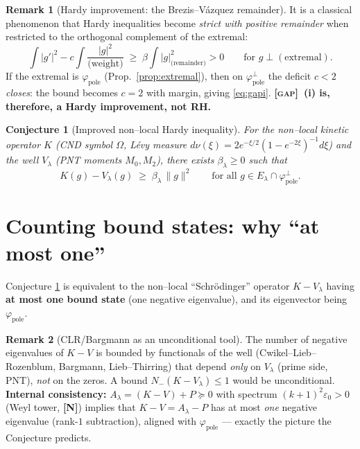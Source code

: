 \documentclass[11pt]{article}
\newcommand{\NM}{\textcolor{blue!70!black}{\textbf{[N]}}}
\newcommand{\GAP}{\textcolor{red!75!black}{\textsc{[gap]}}}
\theoremstyle{plain}
\newtheorem{conjecture}{Conjecture}
\theoremstyle{definition}
\newtheorem{remark}{Remark}
\newcommand{\El}{E_\lambda}
\newcommand{\kin}{K}
\newcommand{\vv}{V}
\newcommand{\pole}{P}
\newcommand{\fp}{\varphi_{\mathrm{pole}}}
\begin{document}
\begin{remark}[Hardy improvement: the Brezis--Vázquez remainder]
It is a classical phenomenon that Hardy inequalities become \emph{strict with
positive remainder} when restricted to the orthogonal complement of the extremal:
\[
  \int|g'|^2-c\!\int\!\frac{|g|^2}{\text{(weight)}}
  \;\ge\;\beta\int|g|^2_{\text{(remainder)}}>0
  \qquad\text{for }g\perp(\text{extremal}).
\]
If the extremal is $\fp$ (Prop.\ \ref{prop:extremal}), then on $\fp^\perp$ the
deficit $c<2$ \emph{closes}: the bound becomes $c=2$ with margin, giving
\eqref{eq:gapi}. \textbf{\GAP\ (i) is, therefore, a Hardy improvement, not RH.}
\end{remark}

\begin{conjecture}[Improved non--local Hardy inequality]\label{conj:hardy}
For the non--local kinetic operator $\kin$ (CND symbol $\Omega$, Lévy measure
$d\nu(\xi)=2e^{-\xi/2}(1-e^{-2\xi})^{-1}d\xi$) and the well $\vv_\lambda$ (PNT moments
$M_0,M_2$), there exists $\beta_\lambda\ge0$ such that
\[
  \kin(g)-\vv_\lambda(g)\;\ge\;\beta_\lambda\,\|g\|^2
  \qquad\text{for all }g\in\El\cap\fp^\perp .
\]
\end{conjecture}

\section{Counting bound states: why ``at most one''}\label{sec:bargmann}

Conjecture \ref{conj:hardy} is equivalent to the non--local ``Schrödinger'' operator
$\kin-\vv_\lambda$ having \textbf{at most one bound state} (one negative eigenvalue), and
its eigenvector being $\fp$.

\begin{remark}[CLR/Bargmann as an unconditional tool]
The number of negative eigenvalues of $\kin-\vv$ is bounded by functionals of the well
(Cwikel--Lieb--Rozenblum, Bargmann, Lieb--Thirring) that depend \emph{only} on
$\vv_\lambda$ (prime side, PNT), \emph{not} on the zeros. A bound
$N_-(\kin-\vv_\lambda)\le1$ would be unconditional. \textbf{Internal consistency:}
$A_\lambda=(\kin-\vv)+\pole\succeq0$ with spectrum $(k+1)^2\varepsilon_0>0$ (Weyl
tower, \NM) implies that $\kin-\vv=A_\lambda-\pole$ has at most \emph{one} negative
eigenvalue (rank-$1$ subtraction), aligned with $\fp$ --- exactly the picture the
Conjecture predicts.
\end{remark}
\end{document}
